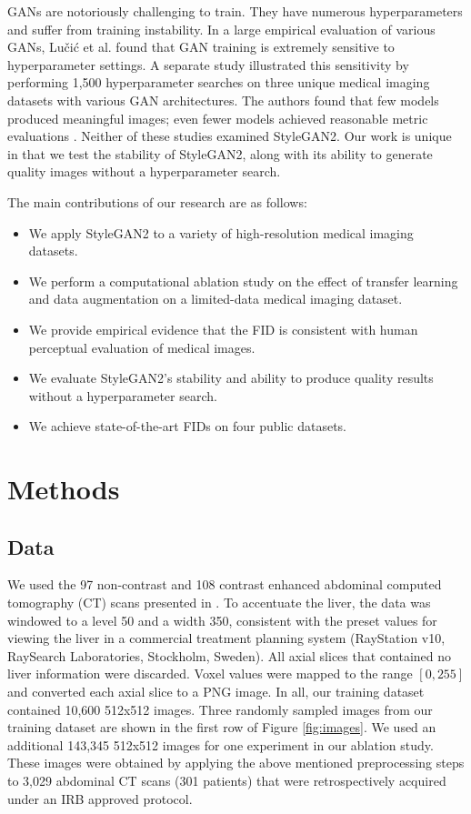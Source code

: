 \documentclass[runningheads]{llncs}
\begin{document}
GANs are notoriously challenging to train.
They have numerous hyperparameters and suffer from training instability.
In a large empirical evaluation of various GANs, Lučić et al. \cite{Lucic2018} found that GAN training is extremely sensitive to hyperparameter settings.
A separate study illustrated this sensitivity by performing 1,500 hyperparameter searches on three unique medical imaging datasets with various GAN architectures.
The authors found that few models produced meaningful images; even fewer models achieved reasonable metric evaluations \cite{skandarani2021}.
Neither of these studies examined StyleGAN2.
Our work is unique in that we test the stability of StyleGAN2, along with its ability to generate quality images without a hyperparameter search.

The main contributions of our research are as follows:
\begin{itemize}
    \item We apply StyleGAN2 to a variety of high-resolution medical imaging datasets.
    \item We perform a computational ablation study on the effect of transfer learning and data augmentation on a limited-data medical imaging dataset.
    \item We provide empirical evidence that the FID is consistent with human perceptual evaluation of medical images.
    \item We evaluate StyleGAN2's stability and ability to produce quality results without a hyperparameter search.
    \item We achieve state-of-the-art FIDs on four public datasets.
\end{itemize}

\section{Methods}

\subsection{Data}

We used the 97 non-contrast and 108 contrast enhanced abdominal computed tomography (CT) scans presented in \cite{Anderson2021}.
To accentuate the liver, the data was windowed to a level 50 and a width 350, consistent with the preset values for viewing the liver in a commercial treatment planning system (RayStation v10, RaySearch Laboratories, Stockholm, Sweden).
All axial slices that contained no liver information were discarded.
Voxel values were mapped to the range $[0, 255]$ and converted each axial slice to a PNG image.
In all, our training dataset contained 10,600 512x512 images.
Three randomly sampled images from our training dataset are shown in the first row of Figure \ref{fig:images}.
We used an additional 143,345 512x512 images for one experiment in our ablation study.
These images were obtained by applying the above mentioned preprocessing steps to 3,029 abdominal CT scans (301 patients) that were retrospectively acquired under an IRB approved protocol.
\end{document}
